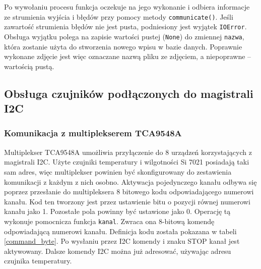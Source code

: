 \documentclass[a4paper,12pt,twoside]{article}
\begin{document}
Po wywołaniu procesu funkcja oczekuje na jego wykonanie i odbiera informacje ze strumienia wyjścia i błędów przy pomocy metody \texttt{communicate()}. Jeśli zawartość strumienia błędów nie jest pusta, podniesiony jest wyjątek \texttt{IOError}. Obsługa wyjątku polega na zapisie wartości pustej (\texttt{None}) do zmiennej \texttt{nazwa}, która zostanie użyta do stworzenia nowego wpisu w bazie danych. Poprawnie wykonane zdjęcie jest więc oznaczane nazwą pliku ze zdjęciem, a niepoprawne -- wartością pustą.
\subsection{Obsługa czujników podłączonych do magistrali I2C}
\subsubsection{Komunikacja z multiplekserem TCA9548A}
Multiplekser TCA9548A umożliwia przyłączenie do 8 urządzeń korzystających z magistrali I2C. Użyte czujniki temperatury i wilgotności Si 7021 posiadają taki sam adres, więc multiplekser powinien być skonfigurowany do zestawienia komunikacji z każdym z nich osobno. Aktywacja pojedynczego kanału odbywa się poprzez przesłanie do multipleksera 8 bitowego kodu odpowiadającego numerowi kanału. Kod ten tworzony jest przez ustawienie bitu o pozycji równej numerowi kanału jako 1. Pozostałe pola powinny być ustawione jako 0. Operację tą wykonuje pomocnicza funkcja \texttt{kanal}. Zwraca ona 8-bitową komendę odpowiadającą numerowi kanału. Definicja kodu została pokazana w tabeli \ref{command_byte}. Po wysłaniu przez I2C komendy i znaku STOP kanał jest aktywowany. Dalsze komendy I2C można już adresować, używając adresu czujnika temperatury.
\end{document}
